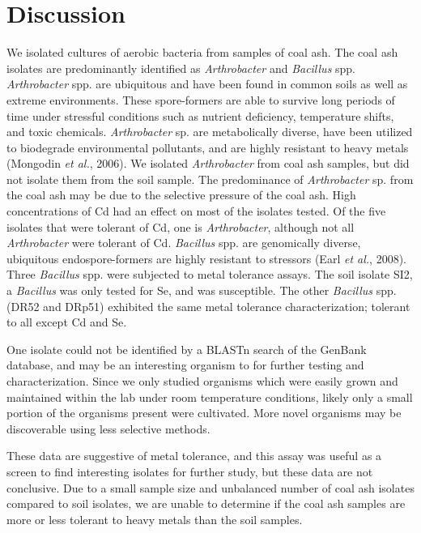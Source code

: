 \documentclass[ms, hidelinks]{uncgdissertationexp}
\theoremstyle{plain}
\theoremstyle{definition}
\theoremstyle{remark}
\begin{document}
\hypertarget{discussion-1}{%
\section{Discussion}\label{discussion-1}}
We isolated cultures of aerobic bacteria from samples of coal ash. The coal ash isolates are predominantly identified as \emph{Arthrobacter} and \emph{Bacillus} spp. \emph{Arthrobacter} spp. are ubiquitous and have been found in common soils as well as extreme environments. These spore-formers are able to survive long periods of time under stressful conditions such as nutrient deficiency, temperature shifts, and toxic chemicals. \emph{Arthrobacter} sp. are metabolically diverse, have been utilized to biodegrade environmental pollutants, and are highly resistant to heavy metals (Mongodin \emph{et al.}, 2006). We isolated \emph{Arthrobacter} from coal ash samples, but did not isolate them from the soil sample. The predominance of \emph{Arthrobacter} sp. from the coal ash may be due to the selective pressure of the coal ash. High concentrations of Cd had an effect on most of the isolates tested. Of the five isolates that were tolerant of Cd, one is \emph{Arthrobacter}, although not all \emph{Arthrobacter} were tolerant of Cd. \emph{Bacillus} spp. are genomically diverse, ubiquitous endospore-formers are highly resistant to stressors (Earl \emph{et al.}, 2008). Three \emph{Bacillus} spp. were subjected to metal tolerance assays. The soil isolate SI2, a \emph{Bacillus} was only tested for Se, and was susceptible. The other \emph{Bacillus} spp. (DR52 and DRp51) exhibited the same metal tolerance characterization; tolerant to all except Cd and Se.

One isolate could not be identified by a BLASTn search of the GenBank database, and may be an interesting organism to for further testing and characterization. Since we only studied organisms which were easily grown and maintained within the lab under room temperature conditions, likely only a small portion of the organisms present were cultivated. More novel organisms may be discoverable using less selective methods.

These data are suggestive of metal tolerance, and this assay was useful as a screen to find interesting isolates for further study, but these data are not conclusive. Due to a small sample size and unbalanced number of coal ash isolates compared to soil isolates, we are unable to determine if the coal ash samples are more or less tolerant to heavy metals than the soil samples.
\end{document}
